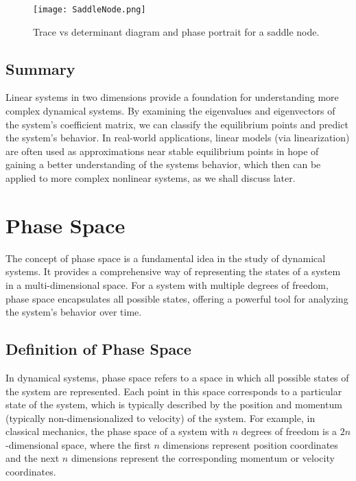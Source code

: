 \documentclass{amsbook}
\begin{document}
\begin{figure}[H]
    \centering
    \texttt{[image: SaddleNode.png]}
    \caption{Trace vs determinant diagram and phase portrait for a saddle node.}
    \label{fig:SaddleNode}
\end{figure}

\subsection{Summary}

Linear systems in two dimensions provide a foundation for understanding more complex dynamical systems. By examining the eigenvalues and eigenvectors of the system's coefficient matrix, we can classify the equilibrium points and predict the system's behavior. In real-world applications, linear models (via linearization) are often used as approximations near stable equilibrium points in hope of gaining a better understanding of the systems behavior, which then can be applied to more complex nonlinear systems, as we shall discuss later.


\section{Phase Space}
The concept of phase space is a fundamental idea in the study of dynamical systems. It provides a comprehensive way of representing the states of a system in a multi-dimensional space. For a system with multiple degrees of freedom, phase space encapsulates all possible states, offering a powerful tool for analyzing the system's behavior over time.

\subsection{Definition of Phase Space}

In dynamical systems, phase space refers to a space in which all possible states of the system are represented. Each point in this space corresponds to a particular state of the system, which is typically described by the position and momentum (typically non-dimensionalized to velocity) of the system. For example, in classical mechanics, the phase space of a system with \( n \) degrees of freedom is a \( 2n \)-dimensional space, where the first \( n \) dimensions represent position coordinates and the next \( n \) dimensions represent the corresponding momentum or velocity coordinates.
\end{document}
